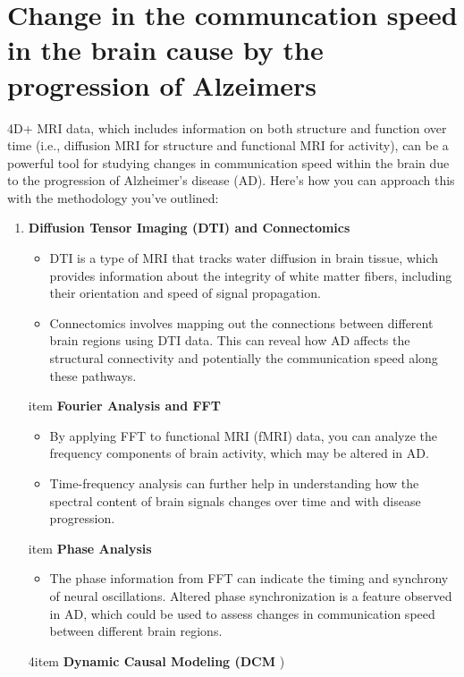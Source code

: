 \documentclass[twocolumn]{article}
\begin{document}
\section{Change in the communcation speed in the brain cause by the progression of Alzeimers}
4D+ MRI data, which includes information on both structure and function over time (i.e., diffusion MRI for structure and functional MRI for activity), can be a powerful tool for studying changes in communication speed within the brain due to the progression of Alzheimer's disease (AD). Here's how you can approach this with the methodology you've outlined:

\begin{enumerate}
\item \textbf{Diffusion Tensor Imaging (DTI) and Connectomics}
\begin{itemize}
\item DTI is a type of MRI that tracks water diffusion in brain tissue, which provides information about the integrity of white matter fibers, including their orientation and speed of signal propagation.
\item Connectomics involves mapping out the connections between different brain regions using DTI data. This can reveal how AD affects the structural connectivity and potentially the communication speed along these pathways.
\end{itemize}
item \textbf{Fourier Analysis and FFT}
\begin{itemize}
\item By applying FFT to functional MRI (fMRI) data, you can analyze the frequency components of brain activity, which may be altered in AD.
\item Time-frequency analysis can further help in understanding how the spectral content of brain signals changes over time and with disease progression.
\end{itemize}
item \textbf{Phase Analysis}
\begin{itemize}
\item The phase information from FFT can indicate the timing and synchrony of neural oscillations. Altered phase synchronization is a feature observed in AD, which could be used to assess changes in communication speed between different brain regions.
\end{itemize}
4item \textbf{Dynamic Causal Modeling (DCM}
)\begin{itemize}

\end{itemize}
\end{enumerate}
\end{document}
